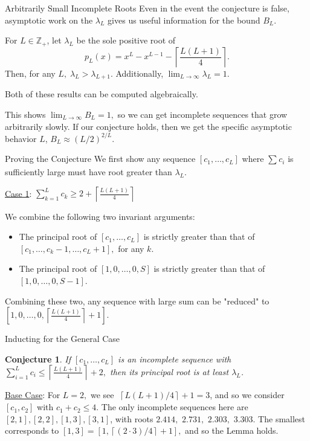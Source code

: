 \documentclass{beamer}
\newtheorem*{conjecture}{Conjecture}
\newcommand{\Z}{\mathbb{Z}}
\begin{document}
\begin{frame}{Arbitrarily Small Incomplete Roots}
Even in the event the conjecture is false, asymptotic work on the $\lambda _{L}$ gives us useful information for the bound $B_{L}$.	
\pause
\medskip
\begin{theorem}[SMALL 2020]
For $L \in \Z _{+}$, let $\lambda _{L}$ be the sole positive root of \[
	p_{L}(x)=x^{L}-x^{L-1}-\left\lceil \frac{L(L+1)}{4} \right\rceil 
.\] 
Then, for any $L,\; \lambda _{L}>\lambda _{L+1}$. Additionally, $\lim_{L \rightarrow \infty }\lambda _{L}=1.$\end{theorem}
\pause
Both of these results can be computed algebraically. 
\pause

This shows $\lim_{L \rightarrow \infty }B_{L}=1,$ so we can get incomplete sequences that grow arbitrarily slowly. If our conjecture holds, then we get the specific asymptotic behavior $L$, $B _{L}\approx \left( L/2 \right) ^{2/L}$.

\end{frame}
\begin{frame}{Proving the Conjecture}
	We first show any sequence $[c_1,\ldots , c_{L}]$ where $\sum_{}^{}c_{i} $ is sufficiently large must have root greater than $\lambda _{L}.$
\pause	

\underline{Case 1}: $\sum_{k=1}^{L}c_k \geq 2+\left\lceil \frac{L(L+1) }{4} \right\rceil$

We combine the following two invariant arguments:

\pause
\begin{itemize}
\item The principal root of  $[c_1,\ldots, c_L]$ is strictly greater than that of $[c_1,\ldots,c_k-1,\ldots,c_L+1],$ for any $k$.
\pause
\item The principal root of $[1,0,\ldots,0,S]$ is strictly greater than that of $[1,0,\ldots,0,S-1]$.
\end{itemize}
\pause
Combining these two, any sequence with large sum can be "reduced" to $[1,0,\ldots,0,\left\lceil \frac{L(L+1) }{4} \right\rceil+1]$. 
\end{frame}
\begin{frame}{Inducting for the General Case}

	\begin{conjecture}
		If $[c_1,\ldots , c_{L}]$ is an incomplete sequence with $\sum_{i=1}^{L}c_{i}\leq \left\lceil \frac{L(L+1)}{4} \right\rceil +2,$ then its principal root is at least $\lambda _{L}$.
	\end{conjecture}
	\pause
\bigskip
\underline{Base Case}:	
For $L=2,$ we see $\; \left\lceil L(L+1)/4 \right\rceil +1=3$, and so we consider $[c_1,c_2]$ with $c_1+c_2\leq 4$. The only incomplete sequences here are $[2,1],[2,2],[1,3],[3,1]$, with roots $2.414,$ $ 2.731,$ $ 2.303,$ $ 3.303$. The smallest corresponds to $[1,3]=[1, \left\lceil (2\cdot 3)/4 \right\rceil +1],$ and so the Lemma holds.
\end{frame}
\end{document}
